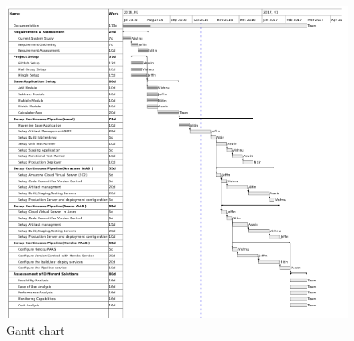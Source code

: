 \documentclass[12pt,a4paper,oneside]{report}
\begin{document}
{\begin{figure}[h]
\begin{center}
\includegraphics[scale=1]{gnt.png}
\caption{Gantt chart}
\label{Gantt chart}
\end{center}
\end{figure}
\newpage

}
\end{document}
